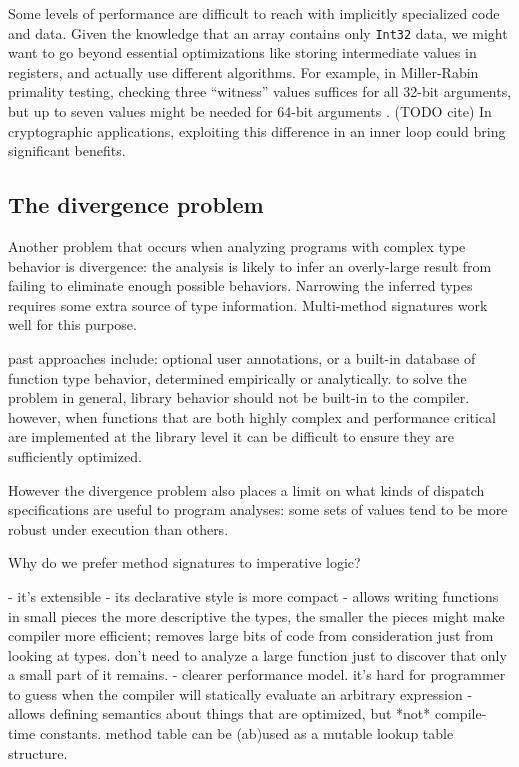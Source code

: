 Some levels of performance are difficult to reach with implicitly
specialized code and data.
Given the knowledge that an array contains only \texttt{Int32} data,
we might want to go beyond essential optimizations like storing intermediate
values in registers, and actually use different algorithms.
For example, in Miller-Rabin primality testing, checking three ``witness''
values suffices for all 32-bit arguments, but up to seven values might be
needed for 64-bit arguments . (TODO cite)
In cryptographic applications, exploiting this difference in an inner loop
could bring significant benefits.


\subsection{The divergence problem}

Another problem that occurs when analyzing programs with complex
type behavior is divergence: the analysis is likely to infer an
overly-large result from failing to eliminate enough possible
behaviors.
Narrowing the inferred types requires some extra source of type
information.
Multi-method signatures work well for this purpose.

past approaches include: optional user annotations, or a built-in
database of function type behavior, determined empirically or
analytically.
to solve the problem in general, library behavior should not be
built-in to the compiler.
however, when functions that are both highly complex and performance
critical are implemented at the library level it can be difficult
to ensure they are sufficiently optimized.

However the divergence problem also places a limit on what
kinds of dispatch specifications are useful to program analyses:
some sets of values tend to be more robust under execution
than others.



Why do we prefer method signatures to imperative logic?

- it's extensible
- its declarative style is more compact
- allows writing functions in small pieces
  the more descriptive the types, the smaller the pieces
  might make compiler more efficient; removes large bits of code from
  consideration just from looking at types. don't need to analyze a
  large function just to discover that only a small part of it
  remains.
- clearer performance model. it's hard for programmer to guess
  when the compiler will statically evaluate an arbitrary expression
- allows defining semantics about things that are optimized, but
  *not* compile-time constants.
  method table can be (ab)used as a mutable lookup table structure.

